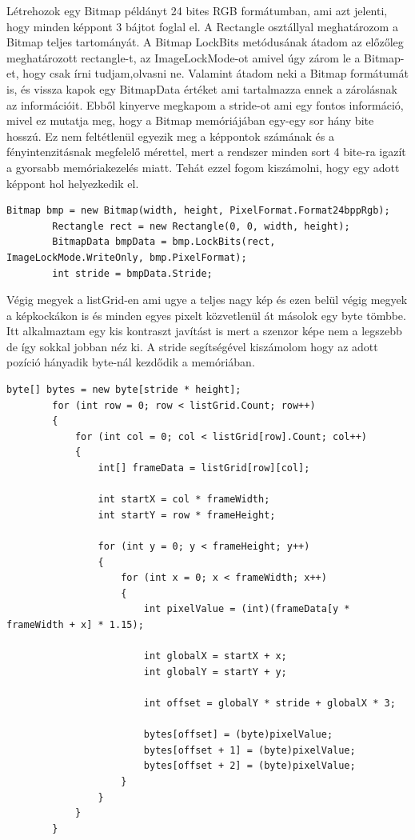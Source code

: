\documentclass[]{thesis-ekf}
\theoremstyle{definition}
\theoremstyle{remark}
\begin{document}
Létrehozok egy Bitmap példányt 24 bites RGB formátumban, ami azt jelenti, hogy minden képpont 3 bájtot foglal el. A Rectangle osztállyal meghatározom a Bitmap teljes tartományát. A Bitmap LockBits metódusának átadom az előzőleg meghatározott rectangle-t, az ImageLockMode-ot amivel úgy zárom le a Bitmap-et, hogy csak írni tudjam,olvasni ne. Valamint átadom neki a Bitmap formátumát is, és vissza kapok egy BitmapData értéket ami tartalmazza ennek a zárolásnak az információit. Ebből kinyerve megkapom a stride-ot ami egy fontos információ, mivel ez mutatja meg, hogy a Bitmap memóriájában egy-egy sor hány bite hosszú. Ez nem feltétlenül egyezik meg a képpontok számának és a fényintenzitásnak megfelelő mérettel, mert a rendszer minden sort 4 bite-ra igazít a gyorsabb memóriakezelés miatt. Tehát ezzel fogom kiszámolni, hogy egy adott képpont hol helyezkedik el.
\begin{lstlisting}[language=CSharp]	 	
	 	Bitmap bmp = new Bitmap(width, height, PixelFormat.Format24bppRgb);
	 	Rectangle rect = new Rectangle(0, 0, width, height);
	 	BitmapData bmpData = bmp.LockBits(rect, ImageLockMode.WriteOnly, bmp.PixelFormat);	 	
	 	int stride = bmpData.Stride;
\end{lstlisting}
Végig megyek a listGrid-en ami ugye a teljes nagy kép és ezen belül végig megyek a képkockákon is és minden egyes pixelt közvetlenül át másolok egy byte tömbbe. Itt alkalmaztam egy kis kontraszt javítást is mert a szenzor képe nem a legszebb de így sokkal jobban néz ki. A stride segítségével kiszámolom hogy az adott pozíció hányadik byte-nál kezdődik a memóriában.
\begin{lstlisting}[language=CSharp]	
		byte[] bytes = new byte[stride * height];
	 	for (int row = 0; row < listGrid.Count; row++)
	 	{
	 		for (int col = 0; col < listGrid[row].Count; col++)
	 		{
	 			int[] frameData = listGrid[row][col];
	 		
	 			int startX = col * frameWidth;
	 			int startY = row * frameHeight;
	 		
	 			for (int y = 0; y < frameHeight; y++)
	 			{
	 				for (int x = 0; x < frameWidth; x++)
	 				{
	 					int pixelValue = (int)(frameData[y * frameWidth + x] * 1.15); 
	 				
	 					int globalX = startX + x;
	 					int globalY = startY + y;
	 				
	 					int offset = globalY * stride + globalX * 3;
	 				
	 					bytes[offset] = (byte)pixelValue;       
	 					bytes[offset + 1] = (byte)pixelValue;   
	 					bytes[offset + 2] = (byte)pixelValue;     
	 				}
	 			}
	 		}
	 	}
\end{lstlisting}
\end{document}
